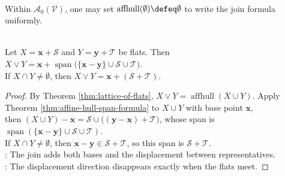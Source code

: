\begin{remark} \label{rem:empty-affine-hull-lattice-convention} \\
Within $\mathcal{A}_0(\mathcal{V})$, one may set $\operatorname{affhull}(\emptyset)\defeq\emptyset$ to write the join formula uniformly.
\end{remark}

\begin{corollary} \label{cor:join-of-two-flats-formula} \\
Let $X=\mathbf{x}+\mathcal{S}$ and $Y=\mathbf{y}+\mathcal{T}$ be flats. Then $X\vee Y=\mathbf{x}+\operatorname{span}\bigl(\{\mathbf{x}-\mathbf{y}\}\cup\mathcal{S}\cup\mathcal{T}\bigr)$.\\
If $X\cap Y\neq\emptyset$, then $X\vee Y=\mathbf{x}+(\mathcal{S}+\mathcal{T})$.
\begin{proof}
By Theorem \ref{thm:lattice-of-flats}, $X\vee Y=\operatorname{affhull}(X\cup Y)$. Apply Theorem \ref{thm:affine-hull-span-formula} to $X\cup Y$ with base point $\mathbf{x}$,\\
then $(X\cup Y)-\mathbf{x}=\mathcal{S}\cup\bigl((\mathbf{y}-\mathbf{x})+\mathcal{T}\bigr)$, whose span is $\operatorname{span}(\{\mathbf{x}-\mathbf{y}\}\cup\mathcal{S}\cup\mathcal{T})$.\\
If $X\cap Y\neq\emptyset$, then $\mathbf{x}-\mathbf{y}\in\mathcal{S}+\mathcal{T}$, so this span is $\mathcal{S}+\mathcal{T}$.\\
: The join adds both bases and the displacement between representatives.\\
: The displacement direction disappears exactly when the flats meet.
\end{proof}
\end{corollary}

